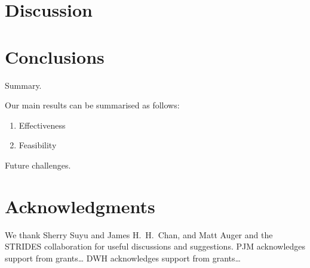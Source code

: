 \documentclass[useAMS,usenatbib]{mn2e}
\begin{document}

\section{Discussion}
\label{sec:discuss}


\section{Conclusions}
\label{sec:concl}

Summary.

Our main results can be summarised as follows:

\begin{enumerate}

\item Effectiveness

\item Feasibility

\end{enumerate}

Future challenges.


\section*{Acknowledgments}
 
We thank Sherry Suyu and James H.\ H.\ Chan, and Matt Auger and the STRIDES
collaboration for useful discussions and suggestions.
PJM acknowledges support from grants\ldots
DWH acknowledges support from grants\ldots











\label{lastpage}
\bsp
\end{document}
